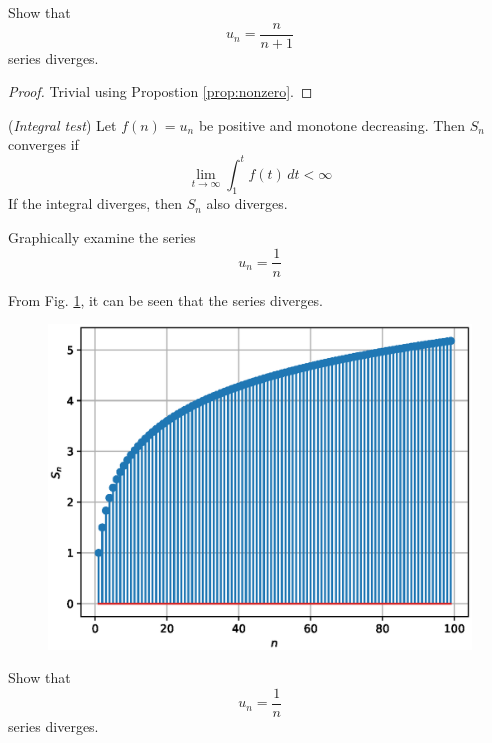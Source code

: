 \documentclass[journal,12pt,twocolumn]{IEEEtran}
\begin{document}
\begin{problem}
Show that 
\begin{equation}
u_n = \frac{n}{n+1}
\end{equation}
series diverges.
\end{problem}
\begin{proof}
Trivial using Propostion \ref{prop:nonzero}.
\end{proof}
\begin{proposition}
({\em Integral test}) Let $f(n)=u_n$ be positive and monotone decreasing. Then $S_n$ converges if
\begin{equation}
\lim_{t \rightarrow \infty}\int_{1}^{t}f(t)\, dt < \infty
\end{equation}
If the integral diverges, then $S_n$ also diverges.
\end{proposition}
%
\begin{problem}
Graphically examine the series 
\begin{equation}
u_n = \frac{1}{n}
\end{equation}

\end{problem}
\solution From Fig. \ref{fig:2}, it can be seen that the series diverges.
%

%
\begin{figure}[!ht]
\begin{center}
\includegraphics[width=\columnwidth]{./figs/2.eps}
\end{center}
\label{fig:2}	
\end{figure}
\begin{problem}
Show that 
\begin{equation}
u_n = \frac{1}{n}
\end{equation}
series diverges.
\end{problem}
\end{document}
